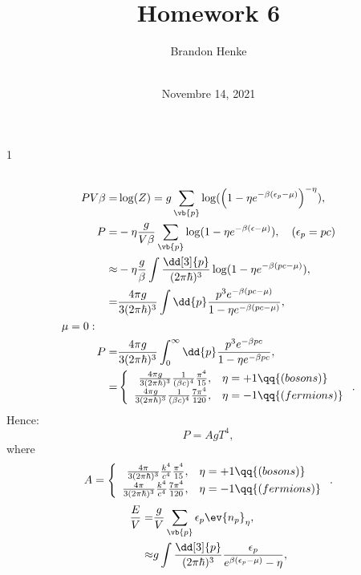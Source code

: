 \documentclass[a4paper,12pt,twoside]{article}
\title{Homework 6}
\author{
	Brandon Henke\\
	\textit{\course}\\
	\textit{\professor}
}
\date{Novembre 14, 2021}
\newcommand{\mcols}{0}
\begin{document}

\maketitle
\if\mcols1
\begin{multicols*}{2}
\fi

\setcounter{section}{6}
\subsection{}
\begin{align}
	PV\beta =& \log(Z) = g\sum_{\vb{p}}\log(\left(1-\eta e^{-\beta(\epsilon_p-\mu)}\right)^{-\eta}),\\
	P =& -\eta \frac{g}{V\beta} \sum_{\vb{p}} \log(1-\eta e^{-\beta(\epsilon-\mu)}), \quad (\epsilon_p = pc)\\
	\approx& -\eta \frac{g}{\beta} \int \frac{\dd[3]{p}}{(2\pi\hbar)^3} \log(1-\eta e^{-\beta(pc-\mu)}),\\
	=& \frac{4\pi g}{3(2\pi\hbar)^3} \int \dd{p}\frac{p^3 e^{-\beta(pc-\mu)}}{1-\eta e^{-\beta(pc-\mu)}},\\
	\mu = 0:\qquad&\\
	P =& \frac{4\pi g}{3(2\pi\hbar)^3} \int_0^\infty \dd{p}\frac{p^3 e^{-\beta pc}}{1-\eta e^{-\beta pc}},\\
	=& \left\{
		\begin{array}{rl}
			\frac{4\pi g}{3(2\pi\hbar)^3} \frac{1}{(\beta c)^4} \frac{\pi^4}{15}, & \eta = +1 \qq{(bosons)}\\
			\frac{4\pi g}{3(2\pi\hbar)^3} \frac{1}{(\beta c)^4} \frac{7\pi^4}{120}, & \eta = -1 \qq{(fermions)}
		\end{array}
	\right..
\end{align}
Hence:
\begin{equation}
	P = A g T^4,
\end{equation}
where
\begin{equation}
	A = \left\{
		\begin{array}{rl}
			\frac{4\pi}{3(2\pi\hbar)^3} \frac{k^4}{c^4} \frac{\pi^4}{15}, & \eta = +1 \qq{(bosons)}\\
			\frac{4\pi}{3(2\pi\hbar)^3} \frac{k^4}{c^4} \frac{7\pi^4}{120}, & \eta = -1 \qq{(fermions)}
		\end{array}
	\right..
\end{equation}\begin{align}
	\frac{E}{V} =& \frac{g}{V}\sum_{\vb{p}} \epsilon_p \ev{n_p}_\eta,\\
	\approx& g \int \frac{\dd[3]{p}}{(2\pi\hbar)^3} \frac{\epsilon_p}{e^{\beta(\epsilon_p-\mu)}-\eta},\\

\end{align}
\end{multicols*}
\end{document}
